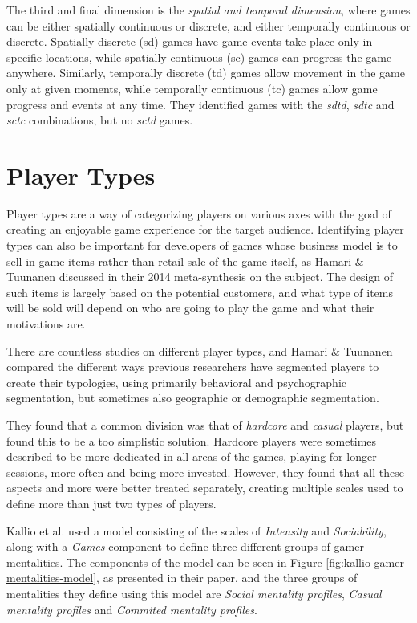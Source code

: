 The third and final dimension is the \emph{spatial and temporal dimension}, where games can be either spatially continuous or discrete, and either temporally continuous or discrete. Spatially discrete (sd) games have game events take place only in specific locations, while spatially continuous (sc) games can progress the game anywhere. Similarly, temporally discrete (td) games allow movement in the game only at given moments, while temporally continuous (tc) games allow game progress and events at any time. They identified games with the \emph{sdtd}, \emph{sdtc} and \emph{sctc} combinations, but no \emph{sctd} games.

\section{Player Types}
\label{sec:player-types}

Player types are a way of categorizing players on various axes with the goal of creating an enjoyable game experience for the target audience. Identifying player types can also be important for developers of games whose business model is to sell in-game items rather than retail sale of the game itself, as Hamari \& Tuunanen \cite{hamari2014playertypes} discussed in their 2014 meta-synthesis on the subject. The design of such items is largely based on the potential customers, and what type of items will be sold will depend on who are going to play the game and what their motivations are.

There are countless studies on different player types, and Hamari \& Tuunanen \cite{hamari2014playertypes} compared the different ways previous researchers have segmented players to create their typologies, using primarily behavioral and psychographic segmentation, but sometimes also geographic or demographic segmentation.

They found that a common division was that of \emph{hardcore} and \emph{casual} players, but found this to be a too simplistic solution. Hardcore players were sometimes described to be more dedicated in all areas of the games, playing for longer sessions, more often and being more invested. However, they found that all these aspects and more were better treated separately, creating multiple scales used to define more than just two types of players.

Kallio et al. \cite{kallio2011gamermentalities} used a model consisting of the scales of \emph{Intensity} and \emph{Sociability}, along with a \emph{Games} component to define three different groups of gamer mentalities. The components of the model can be seen in Figure \ref{fig:kallio-gamer-mentalities-model}, as presented in their paper, and the three groups of mentalities they define using this model are \emph{Social mentality profiles}, \emph{Casual mentality profiles} and \emph{Commited mentality profiles}.

